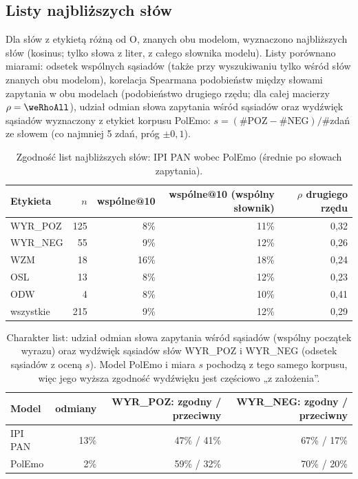 \subsection{Listy najbliższych słów}\label{sec:we-knn}

Dla \weNQueries{} słów z etykietą różną od O, znanych obu modelom, wyznaczono \weK{} najbliższych słów (kosinus;
tylko słowa z liter, z całego słownika modelu). Listy porównano miarami: odsetek wspólnych sąsiadów (także przy
wyszukiwaniu tylko wśród \weSharedVocab{} słów znanych obu modelom), korelacja Spearmana podobieństw między słowami
zapytania w obu modelach (podobieństwo drugiego rzędu; dla całej macierzy $\rho=\weRhoAll$), udział odmian słowa zapytania
wśród sąsiadów oraz wydźwięk sąsiadów wyznaczony z etykiet korpusu PolEmo: $s=(\#\mathrm{POZ}-\#\mathrm{NEG})/\#$zdań
ze słowem (co najmniej 5 zdań, próg $\pm 0{,}1$).

\begin{table}[H]
\centering\small
\begin{tabular}{lrrrr}
\toprule
Etykieta & $n$ & wspólne@10 & wspólne@10 (wspólny słownik) & $\rho$ drugiego rzędu \\
\midrule
WYR\_POZ & 125 & 8\% & 11\% & 0{,}32 \\
WYR\_NEG & 55 & 9\% & 12\% & 0{,}26 \\
WZM & 18 & 16\% & 18\% & 0{,}24 \\
OSL & 13 & 8\% & 12\% & 0{,}23 \\
ODW & 4 & 8\% & 10\% & 0{,}41 \\
wszystkie & 215 & 9\% & 12\% & 0{,}29 \\
\bottomrule
\end{tabular}
\caption{Zgodność list najbliższych słów: IPI PAN wobec PolEmo (średnie po słowach zapytania).}
\label{tab:we-knn-overlap}
\end{table}

\begin{table}[H]
\centering\small
\begin{tabular}{lrrr}
\toprule
Model & odmiany & WYR\_POZ: zgodny / przeciwny & WYR\_NEG: zgodny / przeciwny \\
\midrule
IPI PAN & 13\% & 47\% / 41\% & 67\% / 17\% \\
PolEmo & 2\% & 59\% / 32\% & 70\% / 20\% \\
\bottomrule
\end{tabular}
\caption{Charakter list: udział odmian słowa zapytania wśród sąsiadów (wspólny początek wyrazu) oraz wydźwięk sąsiadów słów WYR\_POZ i WYR\_NEG (odsetek sąsiadów z oceną $s$).
Model PolEmo i miara $s$ pochodzą z tego samego korpusu, więc jego wyższa zgodność wydźwięku jest częściowo „z założenia''.}
\label{tab:we-knn-character}
\end{table}

